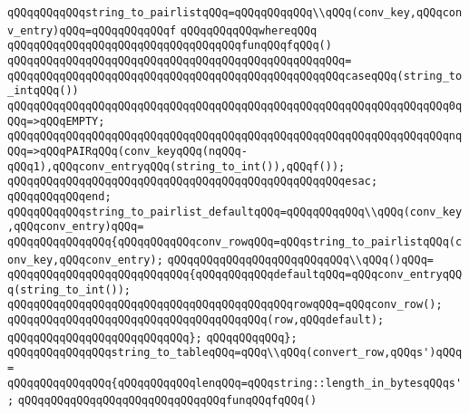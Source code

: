 \verb|qQQqqQQqqQQqstring_to_pairlistqQQq=qQQqqQQqqQQq\\qQQq(conv_key,qQQqconv_entry)qQQq=qQQqqQQqqQQqf|\newline
\verb|qQQqqQQqqQQqwhereqQQq|\newline
\verb|qQQqqQQqqQQqqQQqqQQqqQQqqQQqqQQqqQQqfunqQQqfqQQq()|\newline
\verb|qQQqqQQqqQQqqQQqqQQqqQQqqQQqqQQqqQQqqQQqqQQqqQQqqQQq=|\newline
\verb|qQQqqQQqqQQqqQQqqQQqqQQqqQQqqQQqqQQqqQQqqQQqqQQqqQQqcaseqQQq(string_to_intqQQq())|\newline
\verb|qQQqqQQqqQQqqQQqqQQqqQQqqQQqqQQqqQQqqQQqqQQqqQQqqQQqqQQqqQQqqQQqqQQq0qQQq=>qQQqEMPTY;|\newline
\verb|qQQqqQQqqQQqqQQqqQQqqQQqqQQqqQQqqQQqqQQqqQQqqQQqqQQqqQQqqQQqqQQqqQQqnqQQq=>qQQqPAIRqQQq(conv_keyqQQq(nqQQq-qQQq1),qQQqconv_entryqQQq(string_to_int()),qQQqf());|\newline
\verb|qQQqqQQqqQQqqQQqqQQqqQQqqQQqqQQqqQQqqQQqqQQqqQQqqQQqesac;|\newline
\verb|qQQqqQQqqQQqend;|\newline
\newline
\verb|qQQqqQQqqQQqstring_to_pairlist_defaultqQQq=qQQqqQQqqQQq\\qQQq(conv_key,qQQqconv_entry)qQQq=|\newline
\verb|qQQqqQQqqQQqqQQq{qQQqqQQqqQQqconv_rowqQQq=qQQqstring_to_pairlistqQQq(conv_key,qQQqconv_entry);|\newline
\verb|qQQqqQQqqQQqqQQqqQQqqQQqqQQq\\qQQq()qQQq=|\newline
\verb|qQQqqQQqqQQqqQQqqQQqqQQqqQQq{qQQqqQQqqQQqdefaultqQQq=qQQqconv_entryqQQq(string_to_int());|\newline
\verb|qQQqqQQqqQQqqQQqqQQqqQQqqQQqqQQqqQQqqQQqqQQqrowqQQq=qQQqconv_row();|\newline
\verb|qQQqqQQqqQQqqQQqqQQqqQQqqQQqqQQqqQQqqQQq(row,qQQqdefault);|\newline
\verb|qQQqqQQqqQQqqQQqqQQqqQQqqQQq};|\newline
\verb|qQQqqQQqqQQq};|\newline
\newline
\verb|qQQqqQQqqQQqqQQqstring_to_tableqQQq=qQQq\\qQQq(convert_row,qQQqs')qQQq=|\newline
\verb|qQQqqQQqqQQqqQQq{qQQqqQQqqQQqlenqQQq=qQQqstring::length_in_bytesqQQqs';|\newline
\verb|qQQqqQQqqQQqqQQqqQQqqQQqqQQqqQQqfunqQQqfqQQq()|\newline
